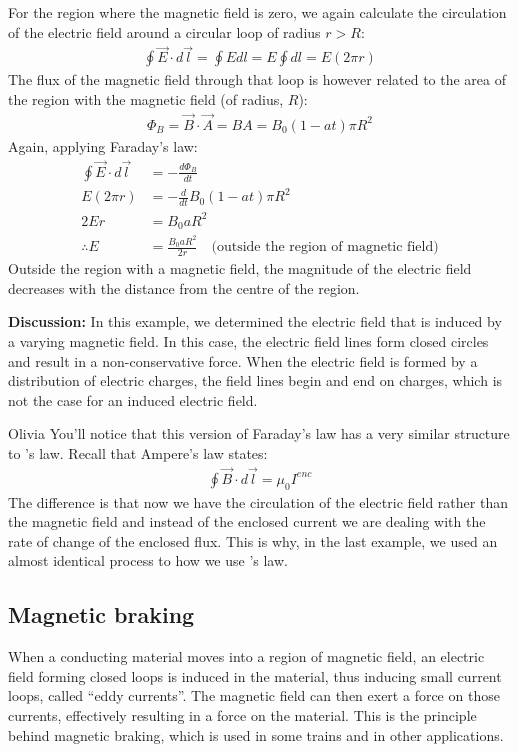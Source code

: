 \begin{example}
For the region where the magnetic field is zero, we again calculate the circulation of the electric field around a circular loop of radius $r>R$:
\begin{align*}
\oint \vec E \cdot d\vec l = \oint Edl = E \oint dl = E(2\pi r)
\end{align*}
The flux of the magnetic field through that loop is however related to the area of the region with the magnetic field (of radius, $R$):
\begin{align*}
\Phi_B = \vec B \cdot \vec A = BA = B_0(1-at) \pi R^2
\end{align*}
Again, applying Faraday's law:
\begin{align*}
\oint \vec E\cdot d\vec l &= -\frac{d\Phi_B}{dt}\\
E(2\pi r) &= -\frac{d}{dt} B_0(1-at) \pi R^2\\
2Er&=  B_0aR^2\\
\therefore E&=\frac{B_0aR^2}{2r}\quad\text{(outside the region of magnetic field)}
\end{align*}
Outside the region with a magnetic field, the magnitude of the electric field decreases with the distance from the centre of the region.

\textbf{Discussion:} In this example, we determined the electric field that is induced by a varying magnetic field. In this case, the electric field lines form closed circles and result in a non-conservative force. When the electric field is formed by a distribution of electric charges, the field lines begin and end on charges, which is not the case for an induced electric field.
\end{example}

\begin{studentOpinion}{Olivia}
You'll notice that this version of Faraday's law has a very similar structure to \ampere 's law. Recall that Ampere's law states:
\begin{align*}
\oint \vec B \cdot d\vec l = \mu_0I^{enc}
\end{align*}
The difference is that now we have the circulation of the electric field rather than the magnetic field and instead of the enclosed current we are dealing with the rate of change of the enclosed flux. This is why, in the last example, we used an almost identical process to how we use \ampere 's law. 
\end{studentOpinion}

\newpage
\subsection{Magnetic braking}
When a conducting material moves into a region of magnetic field, an electric field forming closed loops is induced in the material, thus inducing small current loops, called ``eddy currents''. The magnetic field can then exert a force on those currents, effectively resulting in a force on the material. This is the principle behind magnetic braking, which is used in some trains and in other applications.

